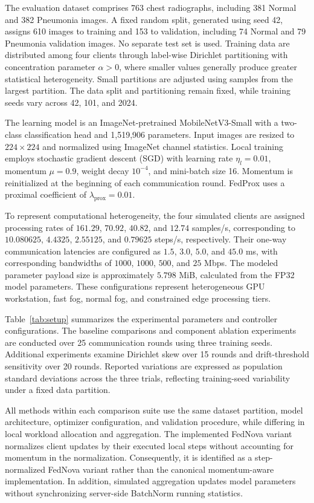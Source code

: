 \documentclass[conference]{IEEEtran}
\begin{document}
The evaluation dataset comprises 763 chest radiographs, including 381 Normal and 382 Pneumonia images. A fixed random split, generated using seed 42, assigns 610 images to training and 153 to validation, including
74 Normal and 79 Pneumonia validation images.
No separate test set is used. Training data are distributed among four clients through label-wise Dirichlet partitioning with concentration parameter $\alpha>0$, where smaller values generally produce greater
statistical heterogeneity. Small partitions are adjusted using samples from the largest partition. The data split and partitioning remain fixed, while training seeds vary across 42, 101, and 2024.

The learning model is an ImageNet-pretrained MobileNetV3-Small with a two-class classification head and 1,519,906 parameters.
Input images are resized to $224\times224$ and normalized using ImageNet channel statistics. Local training employs stochastic gradient descent (SGD) with learning rate $\eta_l=0.01$, momentum $\mu=0.9$, weight decay $10^{-4}$, and mini-batch size 16. Momentum is reinitialized at the beginning of each communication round. FedProx uses a proximal coefficient of
$\lambda_{\mathrm{prox}}=0.01$.

To represent computational heterogeneity, the four simulated clients are assigned processing rates of $161.29$, $70.92$, $40.82$, and $12.74$ samples/s, corresponding to $10.080625$, $4.4325$,
$2.55125$, and $0.79625$ steps/s,
respectively. Their one-way communication latencies are configured as $1.5$, $3.0$, $5.0$, and $45.0$ ms, with corresponding bandwidths of $1000$, $1000$, $500$, and $25$ Mbps. The modeled parameter payload
size is approximately $5.798$ MiB,
calculated from the FP32 model parameters.
These configurations represent heterogeneous GPU workstation, fast fog, normal fog, and constrained edge processing tiers.

Table~\ref{tab:setup} summarizes the
experimental parameters and controller
configurations. The baseline comparisons
and component ablation experiments are
conducted over 25 communication rounds
using three training seeds. Additional
experiments examine Dirichlet skew over
15 rounds and drift-threshold sensitivity over 20 rounds. Reported variations are expressed as population standard deviations across the three trials, reflecting training-seed variability under a fixed data partition.

All methods within each comparison suite
use the same dataset partition, model
architecture, optimizer configuration,
and validation procedure, while differing in local workload allocation and aggregation.
The implemented FedNova variant normalizes client updates by their executed local steps without accounting for momentum in the normalization. Consequently, it is identified as a step-normalized FedNova variant rather than the canonical momentum-aware implementation. In addition, simulated aggregation updates model parameters without synchronizing server-side BatchNorm running statistics.
\end{document}
